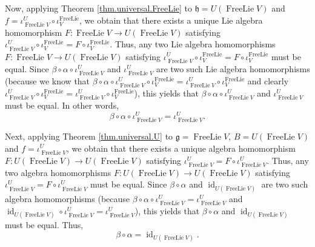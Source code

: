 \documentclass[etingof-lie.tex]{subfiles}
\begin{document}
Now, applying Theorem \ref{thm.universal.FreeLie} to $\mathfrak{h}=U\left(
\operatorname*{FreeLie}V\right)  $ and $f=\iota_{\operatorname*{FreeLie}V}%
^{U}\circ\iota_{V}^{\operatorname*{FreeLie}}$, we obtain that there exists a
unique Lie algebra homomorphism $F:\operatorname*{FreeLie}V\rightarrow
U\left(  \operatorname*{FreeLie}V\right)  $ satisfying $\iota
_{\operatorname*{FreeLie}V}^{U}\circ\iota_{V}^{\operatorname*{FreeLie}}%
=F\circ\iota_{V}^{\operatorname*{FreeLie}}$. Thus, any two Lie algebra
homomorphisms $F:\operatorname*{FreeLie}V\rightarrow U\left(
\operatorname*{FreeLie}V\right)  $ satisfying $\iota_{\operatorname*{FreeLie}%
V}^{U}\circ\iota_{V}^{\operatorname*{FreeLie}}=F\circ\iota_{V}%
^{\operatorname*{FreeLie}}$ must be equal. Since $\beta\circ\alpha\circ
\iota_{\operatorname*{FreeLie}V}^{U}$ and $\iota_{\operatorname*{FreeLie}%
V}^{U}$ are two such Lie algebra homomorphisms (because we know that
$\beta\circ\alpha\circ\iota_{\operatorname*{FreeLie}V}^{U}\circ\iota
_{V}^{\operatorname*{FreeLie}}=\iota_{\operatorname*{FreeLie}V}^{U}\circ
\iota_{V}^{\operatorname*{FreeLie}}$ and clearly $\iota
_{\operatorname*{FreeLie}V}^{U}\circ\iota_{V}^{\operatorname*{FreeLie}}%
=\iota_{\operatorname*{FreeLie}V}^{U}\circ\iota_{V}^{\operatorname*{FreeLie}}%
$), this yields that $\beta\circ\alpha\circ\iota_{\operatorname*{FreeLie}%
V}^{U}$ and $\iota_{\operatorname*{FreeLie}V}^{U}$ must be equal. In other
words,%
\[
\beta\circ\alpha\circ\iota_{\operatorname*{FreeLie}V}^{U}=\iota
_{\operatorname*{FreeLie}V}^{U}.
\]


Next, applying Theorem \ref{thm.universal.U} to $\mathfrak{g}%
=\operatorname*{FreeLie}V$, $B=U\left(  \operatorname*{FreeLie}V\right)  $ and
$f=\iota_{\operatorname*{FreeLie}V}^{U}$, we obtain that there exists a unique
algebra homomorphism $F:U\left(  \operatorname*{FreeLie}V\right)  \rightarrow
U\left(  \operatorname*{FreeLie}V\right)  $ satisfying $\iota
_{\operatorname*{FreeLie}V}^{U}=F\circ\iota_{\operatorname*{FreeLie}V}^{U}$.
Thus, any two algebra homomorphisms $F:U\left(  \operatorname*{FreeLie}%
V\right)  \rightarrow U\left(  \operatorname*{FreeLie}V\right)  $ satisfying
$\iota_{\operatorname*{FreeLie}V}^{U}=F\circ\iota_{\operatorname*{FreeLie}%
V}^{U}$ must be equal. Since $\beta\circ\alpha$ and $\operatorname*{id}%
\nolimits_{U\left(  \operatorname*{FreeLie}V\right)  }$ are two such algebra
homomorphisms (because $\beta\circ\alpha\circ\iota_{\operatorname*{FreeLie}%
V}^{U}=\iota_{\operatorname*{FreeLie}V}^{U}$ and $\operatorname*{id}%
\nolimits_{U\left(  \operatorname*{FreeLie}V\right)  }\circ\iota
_{\operatorname*{FreeLie}V}^{U}=\iota_{\operatorname*{FreeLie}V}^{U}$), this
yields that $\beta\circ\alpha$ and $\operatorname*{id}\nolimits_{U\left(
\operatorname*{FreeLie}V\right)  }$ must be equal. Thus,%
\[
\beta\circ\alpha=\operatorname*{id}\nolimits_{U\left(  \operatorname*{FreeLie}%
V\right)  }.
\]
\end{document}
